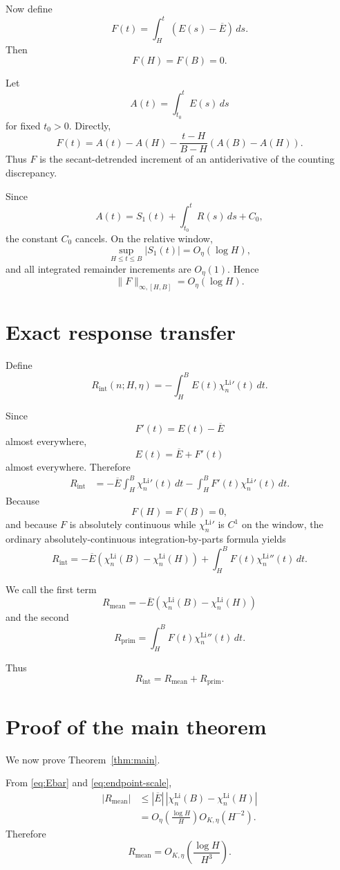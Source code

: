\documentclass[11pt]{article}
\newcommand{\LiSus}{\chi^{\mathrm{Li}}}
\newcommand{\Rint}{R_{\mathrm{int}}}
\newcommand{\Ebar}{\overline E}
\begin{document}
Now define
\[
F(t)
=
\int_H^t
\left(
E(s)-\Ebar
\right)\,ds.
\]
Then
\[
F(H)=F(B)=0.
\]

Let
\[
A(t)
=
\int_{t_0}^t E(s)\,ds
\]
for fixed \(t_0>0\). Directly,
\[
\boxed{
F(t)
=
A(t)-A(H)
-
\frac{t-H}{B-H}
\left(
A(B)-A(H)
\right).
}
\]
Thus \(F\) is the secant-detrended increment of an antiderivative of
the counting discrepancy.

Since
\[
A(t)
=
S_1(t)
+
\int_{t_0}^t R(s)\,ds
+
C_0,
\]
the constant \(C_0\) cancels. On the relative window,
\[
\sup_{H\le t\le B}
|S_1(t)|
=
O_\eta(\log H),
\]
and all integrated remainder increments are \(O_\eta(1)\). Hence
\begin{equation}
\label{eq:Fbound}
\boxed{
\|F\|_{\infty,[H,B]}
=
O_\eta(\log H).
}
\end{equation}

\section{Exact response transfer}

Define
\[
\Rint(n;H,\eta)
=
-
\int_H^B
E(t)\LiSus_n'(t)\,dt.
\]

Since
\[
F'(t)
=
E(t)-\Ebar
\]
almost everywhere,
\[
E(t)=\Ebar+F'(t)
\]
almost everywhere. Therefore
\[
\begin{aligned}
\Rint
&=
-\Ebar
\int_H^B
\LiSus_n'(t)\,dt
-
\int_H^B
F'(t)\LiSus_n'(t)\,dt.
\end{aligned}
\]
Because
\[
F(H)=F(B)=0,
\]
and because \(F\) is absolutely continuous while \(\LiSus_n'\) is
\(C^1\) on the window, the ordinary absolutely-continuous
integration-by-parts formula yields
\begin{equation}
\label{eq:transfer}
\boxed{
\Rint
=
-\Ebar
\left(
\LiSus_n(B)-\LiSus_n(H)
\right)
+
\int_H^B
F(t)\LiSus_n''(t)\,dt.
}
\end{equation}

We call the first term
\[
R_{\mathrm{mean}}
=
-\Ebar
\left(
\LiSus_n(B)-\LiSus_n(H)
\right)
\]
and the second
\[
R_{\mathrm{prim}}
=
\int_H^B
F(t)\LiSus_n''(t)\,dt.
\]

Thus
\[
\Rint
=
R_{\mathrm{mean}}
+
R_{\mathrm{prim}}.
\]

\section{Proof of the main theorem}

We now prove Theorem~\ref{thm:main}.

From \eqref{eq:Ebar} and \eqref{eq:endpoint-scale},
\[
\begin{aligned}
|R_{\mathrm{mean}}|
&\le
|\Ebar|
\,
|\LiSus_n(B)-\LiSus_n(H)|
\\
&=
O_\eta
\left(
\frac{\log H}{H}
\right)
O_{K,\eta}(H^{-2}).
\end{aligned}
\]
Therefore
\begin{equation}
\label{eq:mean-bound}
R_{\mathrm{mean}}
=
O_{K,\eta}
\left(
\frac{\log H}{H^3}
\right).
\end{equation}
\end{document}
